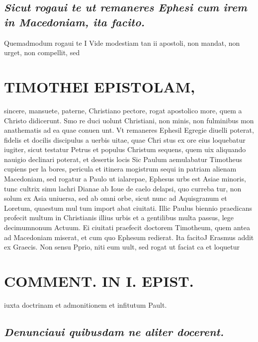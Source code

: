 \documentclass{article}
\begin{document}
\begin{pages}
\subsection*{\textit{Sicut rogaui te ut remaneres Ephesi cum irem in Macedoniam, ita facito. }}\pstart Quemadmodum rogaui te I Vide modestiam tan ii apostoli, non mandat, non urget, non compellit, sed  \pend
\section*{TIMOTHEI EPISTOLAM, }
\marginpar{[ p.11 ]}\pstart sincere, mansuete, paterne, Christiano pectore, rogat apostolico more, quem a Christo didicerunt. Smo re duci uolunt Christiani, non minis, non fulminibus mon anathematis ad ea quae conuen unt.  \pend\pstart Vt remaneres Ephesil Egregie diuelli poterat, fidelis et docilis discipulus a uerbis uitae, quae Chri stus ex ore eius loquebatur iugiter, sicut testatur Petrus et populus Christum sequens, quem uix aliquando nauigio declinari poterat, et desertis locis Sic Paulum aemulabatur Timotheus cupiens per la bores, pericula et itinera mogistrum sequi in patriam alienam Macedoniam, sed rogatur a Paulo ut  \pend\pstart ialarepae, Ephesus urbs est Asiae minoris, tunc cultrix simu lachri Dianae ab Ioue de caelo delapsi, quo curreba tur, non solum ex Asia uniuersa, sed ab omni orbe, sicut nunc ad Aquisgranum et Loretum, quaestum mul tum import abat ciuitati. Illic Paulus biennio praedicans profecit multum in Christianis illius urbis et a gentilibus multa passus, lege decimumnonum Actuum. Ei ciuitati praefecit doctorem Timotheum, quem antea ad Macedoniam miserat, et cum quo Ephesum redierat.  \pend\pstart Ita facitoJ Erasmus addit ex Graecis. Non sensu Pprio, niti eum uult, sed rogat ut faciat ca et loquetur  \pend
\section*{COMMENT. IN I. EPIST. }
\marginpar{[ p.12 ]}\pstart iuxta doctrinam et admonitionem et infitutum Pault.  \pend
{}
{}
\subsection*{\textit{Denunciaui quibusdam ne aliter docerent. }}
{}

\end{pages}
\end{document}
